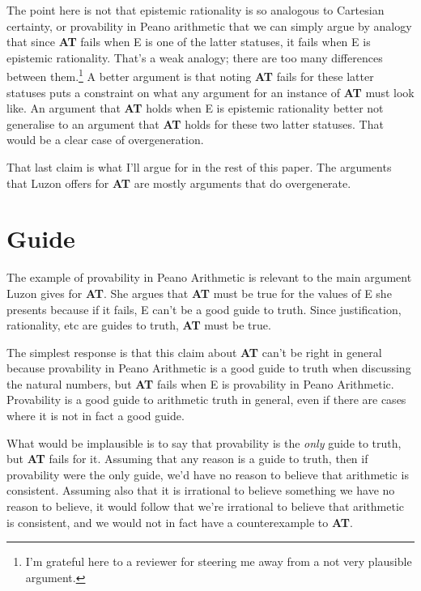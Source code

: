 \documentclass[
  11pt,
  letterpaper,
  DIV=11,
  numbers=noendperiod,
  twoside]{scrartcl}
\begin{document}
The point here is not that epistemic rationality is so analogous to
Cartesian certainty, or provability in Peano arithmetic that we can
simply argue by analogy that since \textbf{AT} fails when E is one of
the latter statuses, it fails when E is epistemic rationality. That's a
weak analogy; there are too many differences between them.\footnote{I'm
  grateful here to a reviewer for steering me away from a not very
  plausible argument.} A better argument is that noting \textbf{AT}
fails for these latter statuses puts a constraint on what any argument
for an instance of \textbf{AT} must look like. An argument that
\textbf{AT} holds when E is epistemic rationality better not generalise
to an argument that \textbf{AT} holds for these two latter statuses.
That would be a clear case of overgeneration.

That last claim is what I'll argue for in the rest of this paper. The
arguments that Luzon offers for \textbf{AT} are mostly arguments that do
overgenerate.

\section{Guide}\label{sec-guide}

The example of provability in Peano Arithmetic is relevant to the main
argument Luzon gives for \textbf{AT}. She argues that \textbf{AT} must
be true for the values of E she presents because if it fails, E can't be
a good guide to truth. Since justification, rationality, etc are guides
to truth, \textbf{AT} must be true.

The simplest response is that this claim about \textbf{AT} can't be
right in general because provability in Peano Arithmetic is a good guide
to truth when discussing the natural numbers, but \textbf{AT} fails when
E is provability in Peano Arithmetic. Provability is a good guide to
arithmetic truth in general, even if there are cases where it is not in
fact a good guide.

What would be implausible is to say that provability is the \emph{only}
guide to truth, but \textbf{AT} fails for it. Assuming that any reason
is a guide to truth, then if provability were the only guide, we'd have
no reason to believe that arithmetic is consistent. Assuming also that
it is irrational to believe something we have no reason to believe, it
would follow that we're irrational to believe that arithmetic is
consistent, and we would not in fact have a counterexample to
\textbf{AT}.
\end{document}
